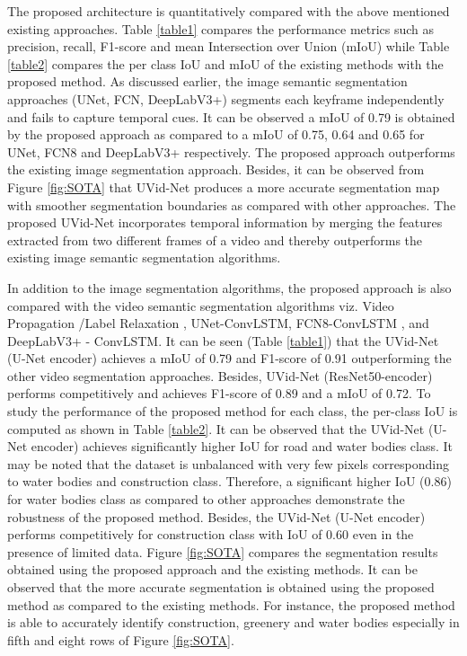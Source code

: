 \documentclass[journal]{IEEEtran}
\begin{document}
The proposed architecture is quantitatively compared with the above mentioned existing approaches. Table \ref{table1} compares the performance metrics such as precision, recall, F1-score and mean Intersection over Union (mIoU) while Table \ref{table2} compares the per class IoU and mIoU of the existing methods with the proposed method. As discussed earlier, the image semantic segmentation approaches (UNet, FCN, DeepLabV3+) segments each keyframe independently and fails to capture temporal cues. It can be observed a mIoU of 0.79 is obtained by the proposed approach as compared to a mIoU of 0.75, 0.64 and 0.65 for UNet, FCN8 and DeepLabV3+ respectively. The proposed approach outperforms the existing image segmentation approach. Besides, it can be observed from Figure \ref{fig:SOTA} that UVid-Net produces a more accurate segmentation map with smoother segmentation boundaries as compared with other approaches. The proposed UVid-Net incorporates temporal information by merging the features extracted from two different frames of a video and thereby outperforms the existing image semantic segmentation algorithms.

In addition to the image segmentation algorithms, the proposed approach is also compared with the video semantic segmentation algorithms viz. Video Propagation /Label Relaxation \cite{22}, UNet-ConvLSTM, FCN8-ConvLSTM \cite{wang2019deep}, and DeepLabV3+ - ConvLSTM. It can be seen (Table \ref{table1})  that the UVid-Net (U-Net encoder) achieves a mIoU of 0.79 and F1-score of 0.91  outperforming the other video segmentation approaches. Besides, UVid-Net (ResNet50-encoder) performs competitively and achieves F1-score of 0.89 and a mIoU of 0.72. To study the performance of the proposed method for each class, the per-class IoU is computed as shown in Table \ref{table2}. It can be observed that the UVid-Net (U-Net encoder) achieves significantly higher IoU for road and water bodies class. It may be noted that the dataset is unbalanced with very few pixels corresponding to water bodies and construction class. Therefore, a significant higher IoU (0.86) for water bodies class as compared to other approaches demonstrate the robustness of the proposed method. Besides, the UVid-Net (U-Net encoder) performs competitively for construction class with IoU of 0.60 even in the presence of limited data. Figure \ref{fig:SOTA} compares the segmentation results obtained using the proposed approach and the existing methods. It can be observed that the more accurate segmentation is obtained using the proposed method as compared to the existing methods. For instance, the proposed method is able to accurately identify construction, greenery and water bodies especially in fifth and eight rows of Figure \ref{fig:SOTA}.
\end{document}
